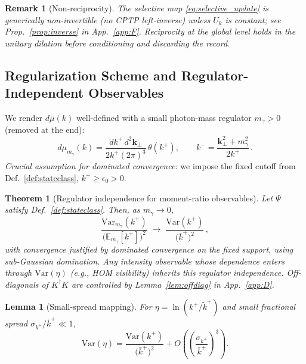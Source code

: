 \documentclass[aps,11pt]{article}
\newcommand{\Var}{\mathrm{Var}}
\newcommand{\E}{\mathbb{E}}
\newcommand{\kplus}{k^{+}}
\newcommand{\kperp}{\mathbf{k}_{\perp}}
\newcommand{\kbar}{\bar{k}^{+}}
\newcommand{\ktil}{\tilde{k}^{+}}
\newtheorem{lem}{Lemma}
\newtheorem{thm}{Theorem}
\newtheorem{remark}{Remark}
\begin{document}
\begin{remark}[Non-reciprocity]
The selective map \eqref{eq:selective_update} is generically non-invertible (no CPTP left-inverse) unless \(U_k\) is constant; see Prop.~\ref{prop:inverse} in App.~\ref{app:F}. Reciprocity at the global level holds in the unitary dilation before conditioning and discarding the record.
\end{remark}

\subsection{Regularization Scheme and Regulator-Independent Observables}\label{sec:reg}
We render \(d\mu(k)\) well-defined with a small photon-mass regulator \(m_\gamma>0\) (removed at the end):
\begin{equation}
d\mu_{m_\gamma}(k)=\frac{d\kplus\, d^2\kperp}{2\kplus(2\pi)^3}\,\theta(\kplus),\qquad
k^-=\frac{\kperp^2+m_\gamma^2}{2\kplus}\,.
\end{equation}
\emph{Crucial assumption for dominated convergence:} we impose the fixed cutoff from Def.~\ref{def:stateclass}, \(\kplus\ge\epsilon_0>0\).

\begin{thm}[Regulator independence for moment-ratio observables]\label{thm:reg_indep}
Let \(\Psi\) satisfy Def.~\ref{def:stateclass}. Then, as \(m_\gamma\to 0\),
\begin{equation}
\frac{\Var_{m_\gamma}(\kplus)}{\big(\E_{m_\gamma}[\kplus]\big)^2}\;\longrightarrow\;
\frac{\Var(\kplus)}{\big(\kbar\big)^{2}}\,,
\end{equation}
with convergence justified by dominated convergence on the fixed support, using sub-Gaussian domination. Any intensity observable whose dependence enters through \(\Var(\eta)\) (e.g., HOM visibility) inherits this regulator independence. Off-diagonals of \(K^\dagger K\) are controlled by Lemma~\ref{lem:offdiag} in App.~\ref{app:D}.
\end{thm}

\begin{lem}[Small-spread mapping]\label{lem:varmap}
For \(\eta=\ln(\kplus/\ktil)\) and small fractional spread \(\sigma_{\kplus}/\kbar\ll1\),
\begin{equation}
\Var(\eta)=\frac{\Var(\kplus)}{\big(\kbar\big)^{2}}+O\!\left(\left(\frac{\sigma_{\kplus}}{\kbar}\right)^{3}\right).
\end{equation}
\end{lem}
\end{document}
